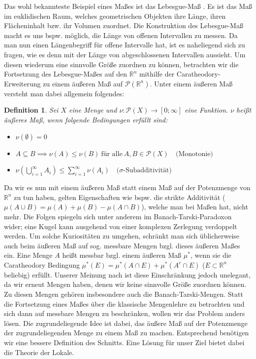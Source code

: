 \documentclass{article}
\newtheorem{definition}[satz]{Definition}
\begin{document}
\noindent Das wohl bekannteste Beispiel eines Maßes ist das Lebesgue-Maß \autocite{wiki_Lebesgue-Maß}. Es ist das Maß im euklidischen Raum, welches geometrischen Objekten ihre Länge, ihren Flächeninhalt bzw. ihr Volumen zuordnet. Die Konstruktion des Lebesgue-Maß macht es uns bspw. möglich, die Länge von offenen Intervallen zu messen. Da man nun einen Längenbegriff für offene Intervalle hat, ist es naheliegend sich zu fragen, wie es denn mit der Länge von abgeschlossenen Intervallen aussieht. Um diesen wiederum eine sinnvolle Größe zuordnen zu können, betrachten wir die Fortsetzung des Lebesgue-Maßes auf den $\mathbb{R}^n$ mithilfe der Caratheodory-Erweiterung zu einem äußeren Maß \autocite{wiki_äußeres_Maß} auf $\mathcal{P}(\mathbb{R}^n)$. Unter einem äußeren Maß versteht man dabei allgemein folgendes: 

\begin{definition}
    Sei $X$ eine Menge und $\nu:\mathcal{P}(X)\to [0;\infty]$ eine Funktion. $\nu$ heißt äußeres Maß, wenn folgende Bedingungen erfüllt sind:
\begin{itemize}
    \item $\nu(\emptyset) = 0$

\item $A \subseteq B \implies \nu(A) \leq \nu(B)~ \text{für alle}~A,B\in\mathcal{P}(X) \quad \text{(Monotonie)}$

\item $\nu\left(\bigcup_{i=1}^\infty A_i\right) \leq \sum_{i=1}^\infty \nu(A_i) \quad (\sigma\text{-Subadditivität)}$

\end{itemize}
\end{definition}
\noindent Da wir es nun mit einem äußeren Maß statt einem Maß auf der Potenzmenge von $\mathbb{R}^n$ zu tun haben, gelten Eigenschaften wie bspw. die strikte Additivität ($\mu (A\cup B)=\mu (A)+\mu(B)-\mu(A\cap B)$), welche man bei Maßen hat, nicht mehr. Die Folgen spiegeln sich unter anderem im Banach-Tarski-Paradoxon wider; eine Kugel kann ausgehend von einer komplexen Zerlegung verdoppelt werden. Um solche Kuriositäten zu umgehen, schränkt man sich üblicherweise auch beim äußeren Maß auf sog. messbare Mengen bzgl. dieses äußeren Maßes ein. Eine Menge $A$ heißt messbar bzgl. einem äußeren Maß $\mu^*$, wenn sie die Caratheodory Bedingung $\mu^*(E)=\mu^*(A\cap E)+\mu^*(A^c\cap E)$ ($E\subset\mathbb{R}^n$ beliebig) erfüllt. Unserer Meinung nach ist diese Einschränkung jedoch unelegant, da wir erneut Mengen haben, denen wir keine sinnvolle Größe zuordnen können. Zu diesen Mengen gehören insbesondere auch die Banach-Tarski-Mengen. Statt die Fortsetzung eines Maßes über die klassische Mengenlehre zu betrachten und sich dann auf messbare Mengen zu beschränken, wollen wir das Problem anders lösen. Die zugrundeliegende Idee ist dabei, das äußere Maß auf der Potenzmenge der zugrundeliegenden Menge zu einem Maß zu machen. Entsprechend benötigen wir eine bessere Definition des Schnitts. Eine Lösung für unser Ziel bietet dabei die Theorie der Lokale.   
\end{document}

